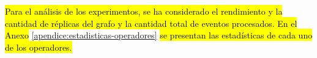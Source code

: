 \hl{Para el análisis de los experimentos, se ha considerado el rendimiento y la cantidad de réplicas del grafo y la cantidad total de eventos procesados. En el Anexo} \ref{apendice:estadisticas-operadores} \hl{se presentan las estadísticas de cada uno de los operadores.}


%
%
%

